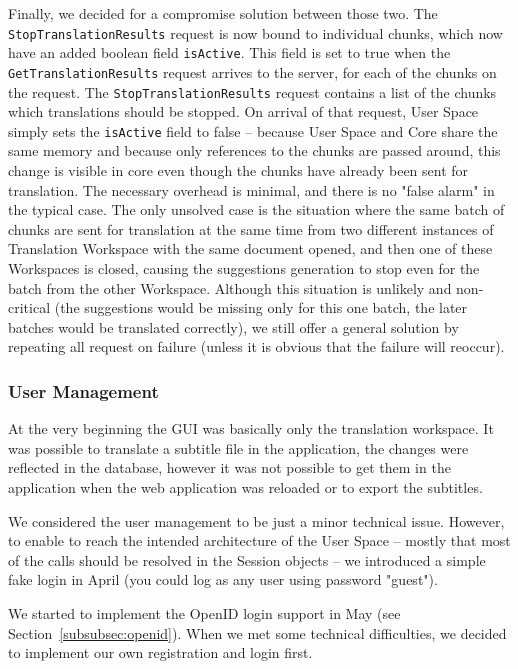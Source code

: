 {Finally, we decided for a compromise solution between those two. The {\tt StopTranslationResults} request is now bound to individual chunks, which now have an added boolean field {\tt isActive}. This field is set to true when the {\tt GetTranslationResults} request arrives to the server, for each of the chunks on the request. The {\tt StopTranslationResults} request contains a list of the chunks which translations should be stopped. On arrival of that request, User Space simply sets the {\tt isActive} field to false -- because User Space and Core share the same memory and because only references to the chunks are passed around, this change is visible in core even though the chunks have already been sent for translation. The necessary overhead is minimal, and there is no "false alarm" in the typical case. The only unsolved case is the situation where the same batch of chunks are sent for translation at the same time from two different instances of Translation Workspace with the same document opened, and then one of these Workspaces is closed, causing the suggestions generation to stop even for the batch from the other Workspace. Although this situation is unlikely and non-critical (the suggestions would be missing only for this one batch, the later batches would be translated correctly), we still offer a general solution by repeating all request on failure (unless it is obvious that the failure will reoccur).

\subsubsection{User Management}

At the very beginning the GUI was basically only the translation workspace. It was possible to translate a subtitle file in the application, the changes were reflected in the database, however it was not possible to get them in the application when the web application was reloaded or to export the subtitles.

We considered the user management to be just a minor technical issue. However, to enable to reach the intended architecture of the User Space -- mostly that most of the calls should be resolved in the Session objects -- we introduced a simple fake login in April (you could log as any user using password "guest").

We started to implement the OpenID login support in May (see Section~\ref{subsubsec:openid}). When we met some technical difficulties, we decided to implement our own registration and login first.

}
